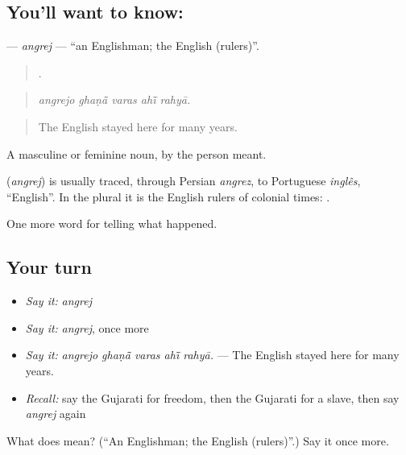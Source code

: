 \subsection*{You'll want to know: }
\textbf{} — \emph{angrej} — \textquotedblleft{}an Englishman; the English (rulers)\textquotedblright{}.

\begin{quote}
    .
\end{quote}

\begin{quote}
\emph{angrejo ghaṇā̃ varas ahī̃ rahyā.}
\end{quote}

\begin{quote}
The English stayed here for many years.
\end{quote}

A masculine or feminine noun, by the person meant.

\begin{cousinweb}
\textbf{} (\emph{angrej}) is usually traced, through Persian \emph{angrez}, to Portuguese \emph{inglês}, \textquotedblleft{}English\textquotedblright{}. In the plural it is the English rulers of colonial times: \textbf{}.
\end{cousinweb}

\begin{grammarlens}[title={What you've built}]
One more word for telling what happened.
\end{grammarlens}

\subsection*{Your turn}
\begin{itemize}
\raggedright
  \item \emph{Say it:} \emph{angrej}
  \item \emph{Say it:} \emph{angrej}, once more
  \item \emph{Say it:} \emph{angrejo ghaṇā̃ varas ahī̃ rahyā.} — The English stayed here for many years.
  \item \emph{Recall:} say the Gujarati for freedom, then the Gujarati for a slave, then say \emph{angrej} again
\end{itemize}

\begin{tcolorbox}[breakable,colback=teal!4,colframe=teal!35!black,title={Before you move on}]
What does  mean? (\textquotedblleft{}An Englishman; the English (rulers)\textquotedblright{}.) Say it once more.
\end{tcolorbox}
